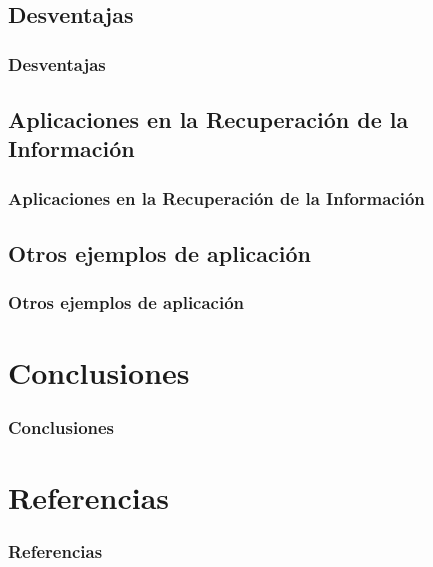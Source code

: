 \documentclass[t,compress,10pt,xcolor=dvipsnames]{beamer}
\begin{document}
	\subsection{Desventajas}
	\frame
	{
		\frametitle{Desventajas}
	}
	
	\subsection{Aplicaciones en la Recuperaci\'on de la Informaci\'on}
	\frame
	{
		\frametitle{Aplicaciones en la Recuperaci\'on de la Informaci\'on}
	}
	
	\subsection{Otros ejemplos de aplicaci\'on}
	\frame
	{
		\frametitle{Otros ejemplos de aplicaci\'on}
	}

	\section{Conclusiones}
	\frame
	{
		\frametitle{Conclusiones}
	}

	\section{Referencias}
	\frame
	{
		\frametitle{Referencias}
	}
\end{document}
